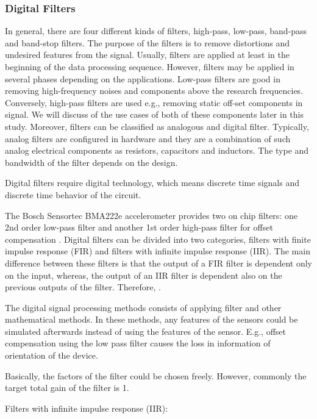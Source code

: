\documentclass[english,12pt,a4paper,pdftex,elec,utf8]{aaltothesis}
\begin{document}
\subsubsection{Digital Filters} \label{digitalfilterssection}

In general, there are four different kinds of filters, high-pass, low-pass, band-pass and band-stop filters. The purpose of the filters is to remove distortions and undesired features from the signal. Usually, filters are applied at least in the beginning of the data processing sequence. However, filters may be applied in several phases depending on the applications.  Low-pass filters are good in removing high-frequency noises and components above the research frequencies. Conversely, high-pass filters are used e.g., removing static off-set components in signal. We will discuss of the use cases of both of these components later in this study. Moreover, filters can be classified as analogous and digital filter. Typically, analog filters are configured in hardware and they are a combination of such analog electrical components as resistors, capacitors and inductors. The type and bandwidth of the filter depends on the design. 

Digital filters require digital technology, which means discrete time signals and discrete time behavior of the circuit.

The Bosch Sensortec BMA222e accelerometer provides two on chip filters: one 2nd order low-pass filter and another 1st order high-pass filter for offset compensation \cite{bma222datasheet}. Digital filters can be divided into two categories, filters with finite impulse response (FIR) and filters with infinite impulse response (IIR). The main difference between these filters is that the output of a FIR filter is dependent only on the input, whereas, the output of an IIR filter is dependent also on the previous outputs of the filter. Therefore, \cite{digitalfilters} \cite{khan2005digital}.

The digital signal processing methods consists of applying filter and other mathematical methods. In these methods, any features of the sensors could be simulated afterwards instead of using the features of the sensor. E.g., offset compensation using the low pass filter causes the loss in information of orientation of the device.

Basically, the factors of the filter could be chosen freely. However, commonly the target total gain of the filter is 1.

Filters with infinite impulse response (IIR):
\end{document}

